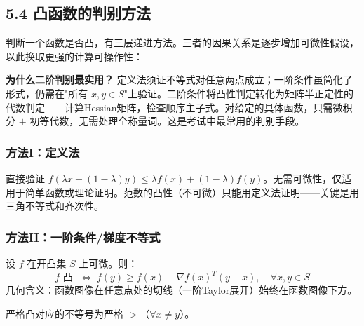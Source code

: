 \subsection{5.4 凸函数的判别方法}

判断一个函数是否凸，有三层递进方法。三者的因果关系是逐步增加可微性假设，以此换取更强的计算可操作性：

\begin{center}
\end{center}

\textbf{为什么二阶判别最实用？} 定义法须证不等式对任意两点成立；一阶条件虽简化了形式，仍需在"所有 $x,y\in S$"上验证。二阶条件将凸性判定转化为矩阵半正定性的代数判定——计算Hessian矩阵，检查顺序主子式。对给定的具体函数，只需微积分 $+$ 初等代数，无需处理全称量词。这是考试中最常用的判别手段。

\subsubsection{方法I：定义法}

直接验证 $f(\lambda x+(1-\lambda)y) \le \lambda f(x)+(1-\lambda)f(y)$。无需可微性，仅适用于简单函数或理论证明。范数的凸性（不可微）只能用定义法证明——关键是用三角不等式和齐次性。

\subsubsection{方法II：一阶条件/梯度不等式}

设 $f$ 在开凸集 $S$ 上可微。则：
\[
f \text{ 凸 } \;\Longleftrightarrow\;
f(y) \ge f(x) + \nabla f(x)^T(y-x),\quad \forall x,y\in S
\]
几何含义：函数图像在任意点处的切线（一阶Taylor展开）始终在函数图像下方。

严格凸对应的不等号为严格 $>$（$\forall x\neq y$）。


